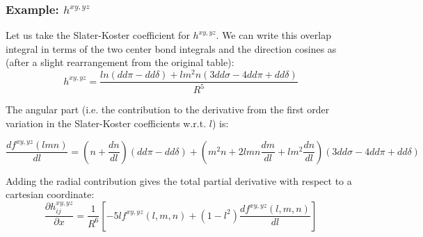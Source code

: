 \subsubsection{Example: $h^{xy,yz}$ }
Let us take the Slater-Koster coefficient for $h^{xy,yz}$. 
We can write this overlap integral in terms of the two center bond integrals 
and the direction cosines as (after a slight rearrangement from the original table):
% 
\begin{equation}
h^{xy,yz} = \frac{ln(dd\pi-dd\delta) + lm^{2}n (3dd\sigma-4dd\pi+dd\delta)}{R^5}
\end{equation}
%

The angular part (i.e. the contribution to the derivative from the first order variation in 
the Slater-Koster coefficients w.r.t. $l$) is:

\begin{equation}
\frac{d{f^{xy,yz}(lmn)}}{dl} = (n + \frac{dn}{dl})(dd\pi-dd\delta) 
                                                  + (m^{2}n +2lmn\frac{dm}{dl}+lm^{2}\frac{dn}{dl})(3dd\sigma-4dd\pi+dd\delta)
\end{equation}

Adding the radial contribution gives the total partial derivative with respect to a cartesian coordinate:
%
\begin{equation}
\frac{\partial h^{xy,yz}_{ij}}{\partial x} =  \frac{1}{R^{6}}[-5lf^{xy,yz}(l,m,n) + (1-l^{2})\frac{df^{xy,yz}(l,m,n)}{dl}]
\end{equation}
%


